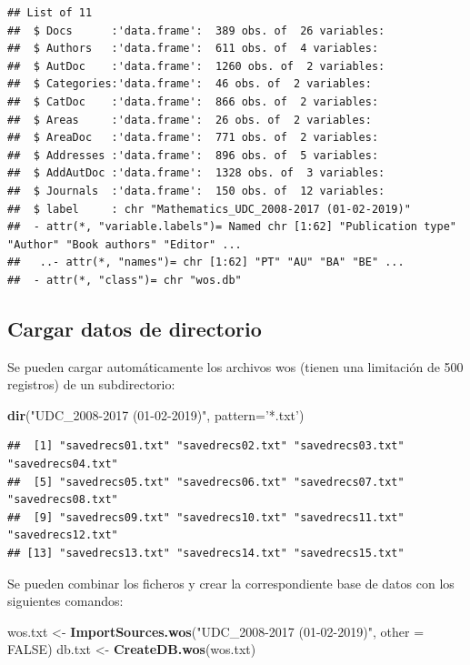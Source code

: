 \documentclass[]{book}
\newenvironment{Shaded}{\begin{snugshade}}{\end{snugshade}}
\newcommand{\KeywordTok}[1]{\textcolor[rgb]{0.13,0.29,0.53}{\textbf{#1}}}
\newcommand{\DataTypeTok}[1]{\textcolor[rgb]{0.13,0.29,0.53}{#1}}
\newcommand{\StringTok}[1]{\textcolor[rgb]{0.31,0.60,0.02}{#1}}
\newcommand{\OtherTok}[1]{\textcolor[rgb]{0.56,0.35,0.01}{#1}}
\newcommand{\NormalTok}[1]{#1}
\begin{document}
\begin{verbatim}
## List of 11
##  $ Docs      :'data.frame':  389 obs. of  26 variables:
##  $ Authors   :'data.frame':  611 obs. of  4 variables:
##  $ AutDoc    :'data.frame':  1260 obs. of  2 variables:
##  $ Categories:'data.frame':  46 obs. of  2 variables:
##  $ CatDoc    :'data.frame':  866 obs. of  2 variables:
##  $ Areas     :'data.frame':  26 obs. of  2 variables:
##  $ AreaDoc   :'data.frame':  771 obs. of  2 variables:
##  $ Addresses :'data.frame':  896 obs. of  5 variables:
##  $ AddAutDoc :'data.frame':  1328 obs. of  3 variables:
##  $ Journals  :'data.frame':  150 obs. of  12 variables:
##  $ label     : chr "Mathematics_UDC_2008-2017 (01-02-2019)"
##  - attr(*, "variable.labels")= Named chr [1:62] "Publication type" "Author" "Book authors" "Editor" ...
##   ..- attr(*, "names")= chr [1:62] "PT" "AU" "BA" "BE" ...
##  - attr(*, "class")= chr "wos.db"
\end{verbatim}

\subsection{Cargar datos de
directorio}\label{cargar-datos-de-directorio}

Se pueden cargar automáticamente los archivos wos (tienen una limitación
de 500 registros) de un subdirectorio:

\begin{Shaded}
\begin{Highlighting}[]
\KeywordTok{dir}\NormalTok{(}\StringTok{"UDC_2008-2017 (01-02-2019)"}\NormalTok{, }\DataTypeTok{pattern=}\StringTok{'*.txt'}\NormalTok{)}
\end{Highlighting}
\end{Shaded}

\begin{verbatim}
##  [1] "savedrecs01.txt" "savedrecs02.txt" "savedrecs03.txt" "savedrecs04.txt"
##  [5] "savedrecs05.txt" "savedrecs06.txt" "savedrecs07.txt" "savedrecs08.txt"
##  [9] "savedrecs09.txt" "savedrecs10.txt" "savedrecs11.txt" "savedrecs12.txt"
## [13] "savedrecs13.txt" "savedrecs14.txt" "savedrecs15.txt"
\end{verbatim}

Se pueden combinar los ficheros y crear la correspondiente base de datos
con los siguientes comandos:

\begin{Shaded}
\begin{Highlighting}[]
\NormalTok{wos.txt <-}\StringTok{ }\KeywordTok{ImportSources.wos}\NormalTok{(}\StringTok{"UDC_2008-2017 (01-02-2019)"}\NormalTok{, }\DataTypeTok{other =} \OtherTok{FALSE}\NormalTok{)}
\NormalTok{db.txt <-}\StringTok{ }\KeywordTok{CreateDB.wos}\NormalTok{(wos.txt)}
\end{Highlighting}
\end{Shaded}
\end{document}
